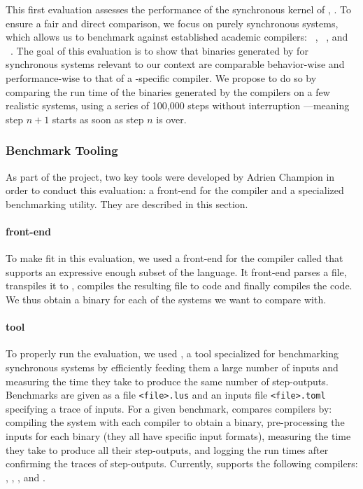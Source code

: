 This first evaluation assesses the performance of the synchronous kernel of \GRust,
\GRSync. To ensure a fair and direct comparison, we focus on purely synchronous systems,
which allows us to benchmark against established academic \Lustre compilers:
\Heptagon~\cite{heptagon}, \LustreC~\cite{lustrec}, and \Velus~\cite{velus}.
The goal of this evaluation is to show that binaries generated by \GRSync for synchronous systems
relevant to our context are comparable behavior-wise and performance-wise to that of a
\Lustre-specific compiler. We propose to do so by comparing the run time of the binaries generated
by the compilers on a few realistic systems, using a series of 100,000 steps without interruption%
---meaning step $n+1$ starts as soon as step $n$ is over.

\subsubsection{Benchmark Tooling}
\label{sec:grust:benchmarks:compare_grsync:tools}

As part of the \GRust project, two key tools were developed by Adrien Champion in order to conduct
this evaluation: a \Lustre front-end for the \GRust compiler and a specialized benchmarking utility.
They are described in this section.

\paragraph{\GLustre front-end}
To make \GRSync fit in this evaluation, we used a front-end for the \GRust compiler called
\GLustre that supports an expressive enough subset of the \Lustre language. It
front-end parses a \Lustre file, transpiles it to \GRSync, compiles the resulting file to \Rust code
and finally compiles the \Rust code. We thus obtain a binary for each of the \Lustre systems we want
to compare with.

\paragraph{\BenchIt tool}
To properly run the evaluation, we used \BenchIt, a tool specialized for
benchmarking synchronous systems by efficiently feeding them a large number of inputs and measuring
the time they take to produce the same number of step-outputs. Benchmarks are given as a \Lustre
file \texttt{<file>.lus} and an inputs file \texttt{<file>.toml} specifying a trace of inputs.
For a given benchmark, \BenchIt compares \Lustre compilers by: compiling the system with each
compiler to obtain a binary, pre-processing the inputs for each binary (they all have specific input
formats), measuring the time they take to produce all their step-outputs, and logging the run
times after confirming the traces of step-outputs.
Currently, \BenchIt supports the following compilers: \Heptagon, \GLustre, \LustreC, and \Velus.

